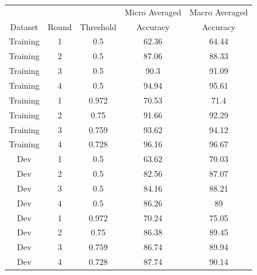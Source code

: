 \documentclass{report}
\theoremstyle{definition}
\theoremstyle{remark}
\begin{document}
\vspace*{-3cm}\begin{table}[H]
    \centering
   \begin{tabular}{ccccc}
    &&&Micro Averaged & Macro Averaged\\
    Dataset & Round & Threshold     & Accuracy &Accuracy\\
    \hline
    Training & 1 & 0.5 & 62.36&64.44\\
    Training & 2 & 0.5 & 87.06&88.33\\
    Training & 3 & 0.5 & 90.3&91.09\\
    Training & 4 & 0.5 & 94.94&95.61\\
    \hline
    Training & 1 & 0.972&70.53&71.4 \\
    Training & 2 & 0.75 &91.66&92.29\\
    Training & 3 & 0.759&93.62&94.12 \\
    Training & 4 & 0.728&96.16&96.67 \\
    \hline
    Dev & 1 & 0.5&63.62&70.03 \\
    Dev & 2 & 0.5&82.56&87.07 \\
    Dev & 3 & 0.5&84.16&88.21 \\
    Dev & 4 & 0.5&86.26&89 \\
    \hline
    Dev & 1 & 0.972&70.24&75.05\\
    Dev & 2 & 0.75 &86.38&89.45\\
    Dev & 3 & 0.759&86.74&89.94\\
    Dev & 4 & 0.728&87.74&90.14\\
    \end{tabular}
    

\end{table}
\end{document}
